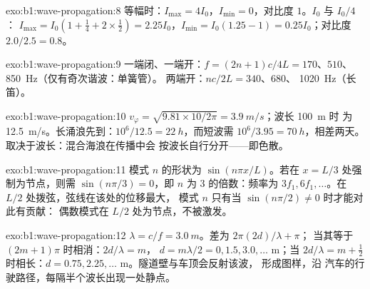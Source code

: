 \begin{solution}{exo:b1:wave-propagation:8}
等幅时：$I_{\max} = 4I_0$，$I_{\min} = 0$，对比度 $1$。$I_0$ 与 $I_0/4$：
$I_{\max} = I_0(1 + \tfrac14 + 2 \times \tfrac12) = 2.25I_0$，$I_{\min} =
I_0(1.25 - 1) = 0.25I_0$；对比度 $2.0/2.5 = 0.8$。
\end{solution}

\begin{solution}{exo:b1:wave-propagation:9}
一端闭、一端开：$f = (2n + 1)c/4L = 170$、$510$、\qty{850}{Hz}（仅有奇次谐波：单簧管）。
两端开：$nc/2L = 340$、$680$、
\qty{1020}{Hz}（长笛）。
\end{solution}

\begin{solution}{exo:b1:wave-propagation:10}
$v_\varphi = \sqrt{9.81 \times 10/2\pi} = \qty{3.9}{m/s}$；波长 \qty{100}{m} 时
为 \qty{12.5}{m/s}。长涌浪先到：$10^6/12.5 =
\qty{22}{h}$，而短波需 $10^6/3.95 = \qty{70}{h}$，相差两天。
取决于波长：混合海浪在传播中会
按波长自行分开——即色散。
\end{solution}

\begin{solution}{exo:b1:wave-propagation:11}
模式 $n$ 的形状为 $\sin(n\pi x/L)$。若在 $x = L/3$ 处强制为节点，则需
$\sin(n\pi/3) = 0$，即 $n$ 为 $3$ 的倍数：频率为 $3f_1,
6f_1, \dots$。在 $L/2$ 处拨弦，弦线在该处的位移最大，
模式 $n$ 只有当 $\sin(n\pi/2) \neq 0$ 时才能对此有贡献：
偶数模式在 $L/2$ 处为节点，不被激发。
\end{solution}

\begin{solution}{exo:b1:wave-propagation:12}
$\lambda = c/f = \qty{3.0}{m}$。差为 $2\pi(2d)/\lambda + \pi$；
当其等于 $(2m + 1)\pi$ 时相消：$2d/\lambda = m$，
$d = m\lambda/2 = 0, 1.5, 3.0, \dots$ m；当 $2d/\lambda =
m + \tfrac12$ 时相长：$d = 0.75, 2.25, \dots$ m。隧道壁与车顶会反射该波，
形成图样，沿
汽车的行驶路径，每隔半个波长出现一处静点。
\end{solution}

